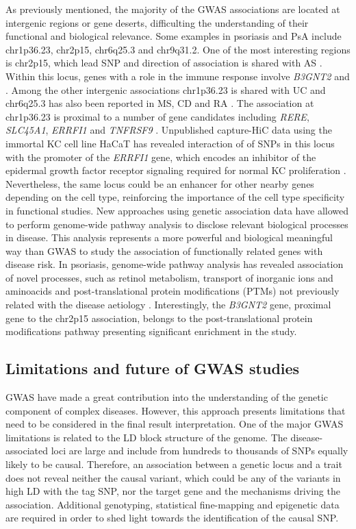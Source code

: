 As previously mentioned, the majority of the GWAS associations are located at intergenic regions or gene deserts, difficulting the understanding of their functional and biological relevance. Some examples in psoriasis and PsA include chr1p36.23, chr2p15, chr6q25.3 and chr9q31.2. One of the most interesting regions is chr2p15, which lead SNP and direction of association is shared with AS \parencite{Immunobase}. Within this locus, genes with a role in the immune response involve \textit{B3GNT2} and \parencite{CMMD1} \parencite{Maine2007, Tsoi2012}. Among the other intergenic associations chr1p36.23 is shared with UC and chr6q25.3 has also been reported in MS, CD and RA \parencite{Immunobase}. The association at chr1p36.23 is proximal to a number of gene candidates including \textit{RERE}, \textit{SLC45A1}, \textit{ERRFI1} and \textit{TNFRSF9} \parencite{Tsoi2012}. Unpublished capture-HiC data using the immortal KC cell line  HaCaT has revealed interaction of of SNPs in this locus with the promoter of the \textit{ERRFI1} gene, which encodes an inhibitor of the epidermal growth factor receptor signaling required for normal KC proliferation \parencite{Ray-Jones2017}. Nevertheless, the same locus could be an enhancer for other nearby genes depending on the cell type, reinforcing the importance of the cell type specificity in functional studies. 
New approaches using genetic association data have allowed to perform genome-wide pathway analysis to disclose relevant biological processes in disease. This analysis represents a more powerful and biological meaningful way than GWAS to study the association of functionally related genes with disease risk. In psoriasis, genome-wide pathway analysis has revealed association of novel processes, such as retinol metabolism, transport of inorganic ions and aminoacids and post-translational protein modifications (PTMs) not previously related with the disease aetiology \parencite{Aterido2015}. Interestingly, the \textit{B3GNT2} gene, proximal gene to the chr2p15 association, belongs to the post-translational protein modifications pathway presenting significant enrichment in the study. 

  

\subsection{Limitations and future of GWAS studies}

GWAS have made a great contribution into the understanding of the genetic component of complex diseases. However, this approach presents limitations that need to be considered in the final result interpretation. 
One of the major GWAS limitations is related to the LD block structure of the genome. The disease-associated loci are large and include from hundreds to thousands of SNPs equally likely to be causal. Therefore, an association between a genetic locus and a trait does not reveal neither the causal variant, which could be any of the variants in high LD with the tag SNP, nor the target gene and the mechanisms driving the association. Additional genotyping, statistical fine-mapping and epigenetic data are required in order to shed light towards the identification of the causal SNP.


